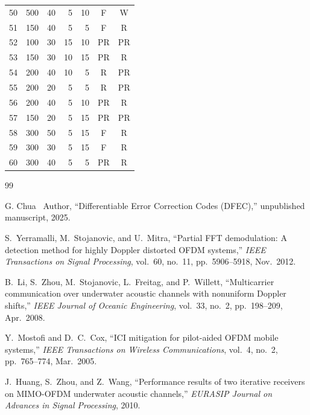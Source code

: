 \documentclass{wileysev}
\begin{document}
\begin{table}[H]
\begin{minipage}[t]{0.49\textwidth}
\begin{tabular}{@{}rrrrrcc@{}}
				50 & 500 & 40 & 5 & 10 & F & W \\
				51 & 150 & 40 & 5 & 5 & F & R \\
				52 & 100 & 30 & 15 & 10 & PR & PR \\
				53 & 150 & 30 & 10 & 15 & PR & R \\
				54 & 200 & 40 & 10 & 5 & R & PR \\
				55 & 200 & 20 & 5 & 5 & R & PR \\
				56 & 200 & 40 & 5 & 10 & PR & R \\
				57 & 150 & 20 & 5 & 15 & PR & PR \\
				58 & 300 & 50 & 5 & 15 & F & R \\
				59 & 300 & 30 & 5 & 15 & F & R \\
				60 & 300 & 40 & 5 & 5 & PR & R \\
				\bottomrule
			\end{tabular}
		\end{minipage}
	\end{table}

	\begin{references}{99}
		
		G. Chua ~Author, ``Differentiable Error Correction Codes (DFEC),'' unpublished manuscript, 2025.
		
		S.~Yerramalli, M.~Stojanovic, and U.~Mitra, ``Partial FFT demodulation: A detection method for highly Doppler distorted OFDM systems,'' \emph{IEEE Transactions on Signal Processing}, vol.~60, no.~11, pp.~5906--5918, Nov.~2012.
		
		B.~Li, S.~Zhou, M.~Stojanovic, L.~Freitag, and P.~Willett, ``Multicarrier communication over underwater acoustic channels with nonuniform Doppler shifts,'' \emph{IEEE Journal of Oceanic Engineering}, vol.~33, no.~2, pp.~198--209, Apr.~2008.
		
		Y.~Mostofi and D.~C.~Cox, ``ICI mitigation for pilot-aided OFDM mobile systems,'' \emph{IEEE Transactions on Wireless Communications}, vol.~4, no.~2, pp.~765--774, Mar.~2005.
		
		J.~Huang, S.~Zhou, and Z.~Wang, ``Performance results of two iterative receivers on MIMO-OFDM underwater acoustic channels,'' \emph{EURASIP Journal on Advances in Signal Processing}, 2010.
		
	\end{references}
	
\end{document}
